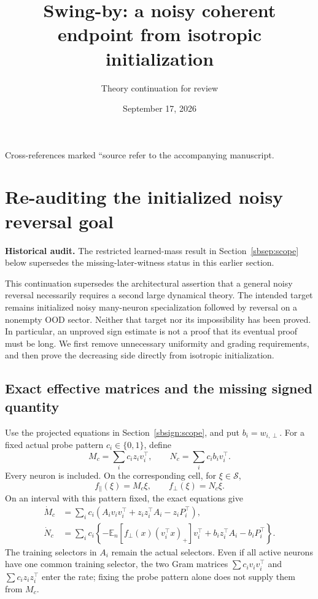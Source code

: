 \documentclass[11pt]{article}
\title{Swing-by: a noisy coherent endpoint from isotropic initialization}
\author{Theory continuation for review}
\date{September 17, 2026}
\theoremstyle{remark}
\begin{document}
\maketitle
\hypertarget{source-anchor}{Cross-references marked ``source refer to the accompanying manuscript.}
\section{Re-auditing the initialized noisy reversal goal}
\label{sbaudit:scope}
\textbf{Historical audit.} The restricted learned-mass result in Section~\ref{sbsep:scope} below supersedes the missing-later-witness status in this earlier section.

This continuation supersedes the architectural assertion that a general noisy
reversal necessarily requires a second large dynamical theory. The intended
target remains initialized noisy many-neuron specialization followed by
reversal on a nonempty OOD sector. Neither that target nor its impossibility
has been proved. In particular, an unproved sign estimate is not a proof that
its eventual proof must be long. We first remove unnecessary uniformity and
grading requirements, and then prove the decreasing side directly from
isotropic initialization.

\subsection{Exact effective matrices and the missing signed quantity}

Use the projected equations in Section~\ref{sbsign:scope}, and put
$b_i=w_{i,\perp}$. For a fixed actual probe pattern $c_i\in\{0,1\}$,
define
\[
 M_c=\sum_i c_i z_iv_i^\top,\qquad
 N_c=\sum_i c_i b_iv_i^\top.
\]
Every neuron is included. On the corresponding cell, for $\xi\in\mathcal S$,
\begin{equation}\label{sbaudit:cell}
 f_\parallel(\xi)=M_c\xi,\qquad f_\perp(\xi)=N_c\xi.
\end{equation}
On an interval with this pattern fixed, the exact equations give
\begin{align}
 \dot M_c&=\sum_i c_i
 (A_iv_iv_i^\top+z_iz_i^\top A_i-z_iP_i^\top),
 \label{sbaudit:matrix-rate}\\
 \dot N_c&=\sum_i c_i
 \left\{-\mathbb E_n[f_\perp(x)(v_i^\top x)_+]v_i^\top
           +b_iz_i^\top A_i-b_iP_i^\top\right\}.
 \label{sbaudit:ambient-rate}
\end{align}
The training selectors in $A_i$ remain the actual selectors. Even if all
active neurons have one common training selector, the two Gram matrices
$\sum c_i v_iv_i^\top$ and $\sum c_i z_iz_i^\top$ enter the rate; fixing
the probe pattern alone does not supply them from $M_c$.
\end{document}
